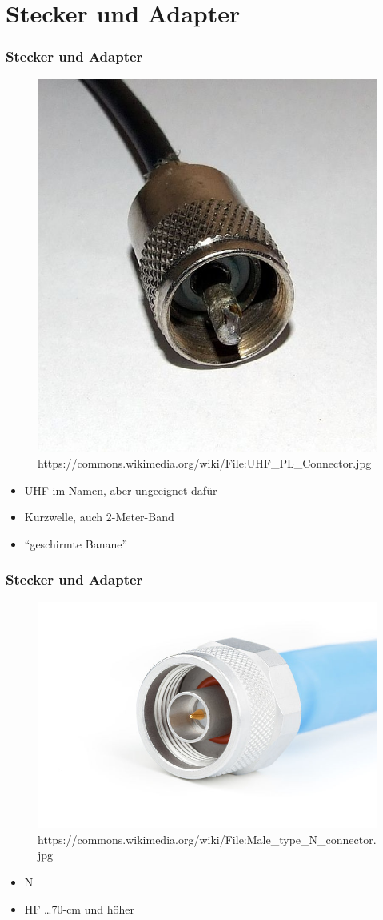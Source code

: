 \section*{Stecker und Adapter}
\begin{frame}
\frametitle{Stecker und Adapter}
\begin{center}
  \begin{figure}
	\includegraphics[width=.6\textwidth,height=.6\textheight,keepaspectratio]{e10/pl.jpg}
                    {https://commons.wikimedia.org/wiki/File:UHF_PL_Connector.jpg}{\ccbysa}
      \end{figure}
	\begin{itemize}
		\item UHF im Namen, aber ungeeignet dafür
		\item Kurzwelle, auch 2-Meter-Band
        \item ``geschirmte Banane''
	\end{itemize}
\end{center}
\end{frame}

\begin{frame}
\frametitle{Stecker und Adapter}
\begin{center}
  \begin{figure}
	\includegraphics[width=.6\textwidth,height=.6\textheight,keepaspectratio]{e10/n.jpg}
                    {https://commons.wikimedia.org/wiki/File:Male_type_N_connector.jpg}{\ccbysa}
      \end{figure}
	\begin{itemize}
		\item N
		\item HF \dots 70-cm und höher
	\end{itemize}	 
\end{center}
\end{frame}

